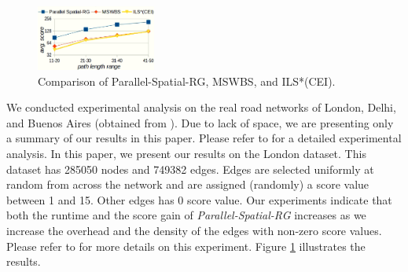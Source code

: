 \begin{figure}%
\centering
\includegraphics[width=0.35\textwidth]{candidate-london.png}
\caption{Comparison of Parallel-Spatial-RG, MSWBS, and ILS*(CEI).}
\label{fig_algo_compare}
\end{figure}
We conducted experimental analysis on the real road networks of London, Delhi, and Buenos Aires (obtained from \cite{Alireza_Karduni}). Due to lack of space, we are presenting only a summary of our results in this paper. Please refer to \cite{Venkata_M_V_Gunturi} for a detailed experimental analysis. In this paper, we present our results on the London dataset. This dataset has 285050 nodes and 749382 edges. Edges are selected uniformly at random from across the network and are assigned (randomly) a score value between 1 and 15. Other edges has 0 score value. Our experiments indicate that both the runtime and the score gain of \textit{Parallel-Spatial-RG} increases as we increase the overhead and the density of the edges with non-zero score values. Please refer to \cite{Venkata_M_V_Gunturi} for more details on this experiment. Figure \ref{fig_algo_compare} illustrates the results.